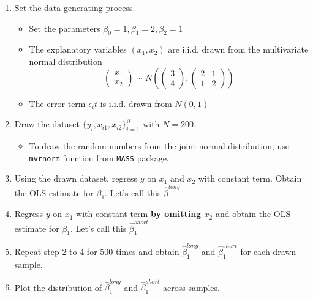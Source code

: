 \documentclass[]{book}
\providecommand{\tightlist}{%
  \setlength{\itemsep}{0pt}\setlength{\parskip}{0pt}}
\begin{document}
\begin{enumerate}
\def\labelenumi{\arabic{enumi}.}
\tightlist
\item
  Set the data generating process.

  \begin{itemize}
  \tightlist
  \item
    Set the parameters \(\beta_0 = 1, \beta_1 = 2, \beta_2 = 1\)
  \item
    The explanatory variables \((x_1, x_2)\) are i.i.d. drawn from the
    multivariate normal distribution \[
    \left(\begin{array}{c}
    x_{1}\\
    x_{2}
    \end{array}\right)\sim N\left(\left(\begin{array}{c}
    3\\
    4
    \end{array}\right),\left(\begin{array}{cc}
    2 & 1\\
    1 & 2
    \end{array}\right)\right)
    \]
  \item
    The error term \(\epsilon_it\) is i.i.d. drawn from \(N(0, 1)\)
  \end{itemize}
\item
  Draw the dataset \(\{y_i, x_{i1}, x_{i2} \}_{i=1}^N\) with
  \(N = 200\).

  \begin{itemize}
  \tightlist
  \item
    To draw the random numbers from the joint normal distribution, use
    \texttt{mvrnorm} function from \texttt{MASS} package.
  \end{itemize}
\item
  Using the drawn dataset, regress \(y\) on \(x_1\) and \(x_2\) with
  constant term. Obtain the OLS estimate for \(\beta_1\). Let's call
  this \(\hat\beta_1^{long}\)
\item
  Regress \(y\) on \(x_1\) with constant term \textbf{by omitting
  \(x_2\)} and obtain the OLS estimate for \(\beta_1\). Let's call this
  \(\hat\beta_1^{short}\)\\
\item
  Repeat step 2 to 4 for \(500\) times and obtain \(\hat\beta_1^{long}\)
  and \(\hat\beta_1^{short}\) for each drawn sample.
\item
  Plot the distribution of \(\hat\beta_1^{long}\) and
  \(\hat\beta_1^{short}\) across samples.
\end{enumerate}
\end{document}
